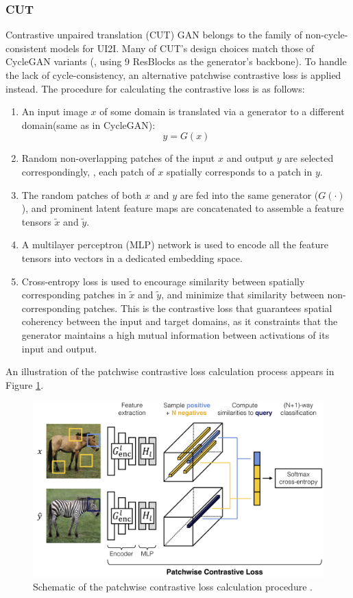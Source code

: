\subsubsection{CUT}
Contrastive unpaired translation (CUT) GAN \cite{park2020cut} belongs to the family of non-cycle-consistent models for UI2I.
Many of CUT's design choices match those of CycleGAN variants (\eg, using 9 ResBlocks as the generator's backbone).
To handle the lack of cycle-consistency, an alternative patchwise contrastive loss is applied instead.
The procedure for calculating the contrastive loss is as follows:
\begin{enumerate}
    \item An input image $x$ of some domain is translated via a generator to a different domain(same as in CycleGAN):
    \begin{equation*}
        y = G(x)        
    \end{equation*}
    \item Random non-overlapping patches of the input $x$ and output $y$ are selected correspondingly, \ie, each patch of $x$ spatially corresponds to a patch in $y$.
    \item The random patches of both $x$ and $y$ are fed into the same generator ($G(\cdot)$), and prominent latent feature maps are concatenated to assemble a feature tensors $\tilde{x}$ and $\tilde{y}$.
    \item A multilayer perceptron (MLP) network is used to encode all the feature tensors into vectors in a dedicated embedding space.
    \item Cross-entropy loss is used to encourage similarity between spatially corresponding patches in $\tilde{x}$ and $\tilde{y}$, and minimize that similarity between non-corresponding patches.
    This is the contrastive loss that guarantees spatial coherency between the input and target domains, as it constraints that the generator maintains a high mutual information between activations of its input and output.
\end{enumerate}
An illustration of the patchwise contrastive loss calculation process appears in Figure \ref{fig:CUT_contrastive_sceheme}.
\begin{figure}[H]
    \centering
    \includegraphics[width=\linewidth]{../figs/related_work/CUT_contrastive_sceheme.jpg}
    \caption{Schematic of the patchwise contrastive loss calculation procedure \cite{park2020cut}.}
    \label{fig:CUT_contrastive_sceheme}
\end{figure}    

